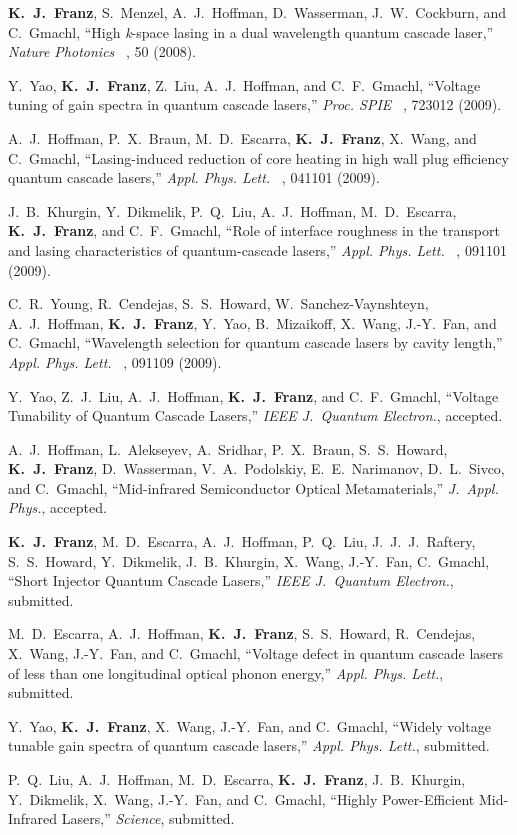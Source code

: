 \begin{list}{}{
  \setlength{\leftmargin}{0.25in}
  \setlength{\rightmargin}{0.25in}
  \setlength{\itemsep}{6pt}
}
\item  \textbf{K.~J.~Franz}, S.~Menzel, A.~J.~Hoffman, D.~Wasserman, J.~W.~Cockburn, and C.~Gmachl, ``High \emph{k}-space lasing in a dual wavelength quantum cascade laser,''  \emph{Nature Photonics}~ , 50 (2008).
\item Y.~Yao, \textbf{K.~J.~Franz}, Z.~Liu, A.~J.~Hoffman, and C.~F.~Gmachl, ``Voltage tuning of gain spectra in quantum cascade lasers,'' \emph{Proc. SPIE}~ , 723012 (2009).
\item A.~J.~Hoffman, P.~X.~Braun, M.~D.~Escarra, \textbf{K.~J.~Franz}, X.~Wang, and C.~Gmachl, ``Lasing-induced reduction of core heating in high wall plug efficiency quantum cascade lasers,'' \emph{Appl. Phys. Lett.}~ , 041101 (2009).
\item J.~B.~Khurgin, Y.~Dikmelik, P.~Q.~Liu, A.~J.~Hoffman, M.~D.~Escarra, \textbf{K.~J.~Franz}, and C.~F.~Gmachl, ``Role of interface roughness in the transport and lasing characteristics of quantum-cascade lasers,'' \emph{Appl. Phys. Lett.}~ , 091101 (2009).
\item C.~R.~Young, R.~Cendejas, S.~S.~Howard, W.~Sanchez-Vaynshteyn, A.~J.~Hoffman,  \textbf{K.~J.~Franz}, Y.~Yao, B.~Mizaikoff, X.~Wang, J.-Y.~Fan, and C.~Gmachl, ``Wavelength selection for quantum cascade lasers by cavity length,'' \emph{Appl. Phys. Lett.}~ , 091109 (2009).
\item Y.~Yao, Z.~J.~Liu, A.~J.~Hoffman, \textbf{K.~J.~Franz}, and C.~F.~Gmachl, ``Voltage Tunability of Quantum Cascade Lasers,'' \emph{IEEE J.~Quantum Electron.}, accepted.
\item A.~J.~Hoffman, L.~Alekseyev, A.~Sridhar, P.~X.~Braun, S.~S.~Howard, \textbf{K.~J.~Franz},  D.~Wasserman, V.~A.~Podolskiy, E.~E.~Narimanov, D.~L.~Sivco, and C.~Gmachl, ``Mid-infrared Semiconductor Optical Metamaterials,'' \emph{J.~Appl. Phys.}, accepted.
\item \textbf{K.~J.~Franz}, M.~D.~Escarra, A.~J.~Hoffman, P.~Q.~Liu, J.~J.~J.~Raftery, S.~S.~Howard,  Y.~Dikmelik, J.~B.~Khurgin, X.~Wang, J.-Y.~Fan, C.~Gmachl, ``Short Injector Quantum Cascade Lasers,'' \emph{IEEE J.~Quantum Electron.}, submitted.
\item M.~D.~Escarra, A.~J.~Hoffman, \textbf{K.~J.~Franz}, S.~S.~Howard, R.~Cendejas, X.~Wang, \mbox{J.-Y.~Fan}, and C.~Gmachl, ``Voltage defect in quantum cascade lasers of less than one longitudinal optical phonon energy,'' \emph{Appl. Phys. Lett.}, submitted.
\item Y.~Yao, \textbf{K.~J.~Franz}, X.~Wang, J.-Y.~Fan, and C.~Gmachl, ``Widely voltage tunable gain spectra of quantum cascade lasers,'' \emph{Appl. Phys. Lett.}, submitted.
\item P.~Q.~Liu, A.~J.~Hoffman, M.~D.~Escarra, \textbf{K.~J.~Franz}, J.~B.~Khurgin, Y.~Dikmelik, X.~Wang, J.-Y.~Fan, and C.~Gmachl, ``Highly Power-Efficient Mid-Infrared Lasers,'' \emph{Science}, submitted.
\end{list}



% 